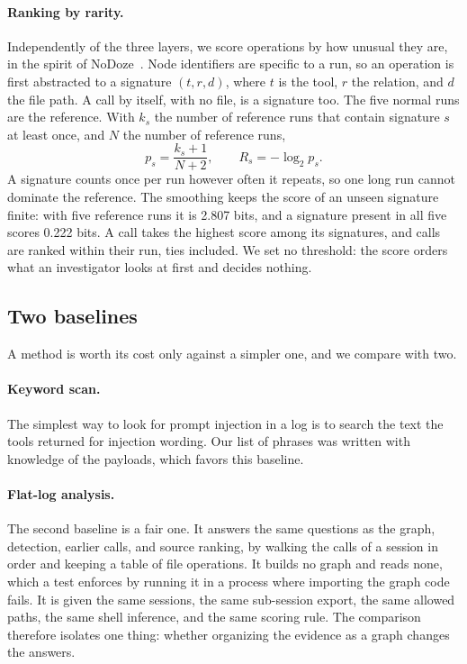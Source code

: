\paragraph{Ranking by rarity.}
Independently of the three layers, we score operations by how unusual they are, in the spirit of NoDoze~\cite{nodoze}.
Node identifiers are specific to a run, so an operation is first abstracted to a signature $(t, r, d)$, where $t$ is the tool, $r$ the relation, and $d$ the file path.
A call by itself, with no file, is a signature too.
The five normal runs are the reference.
With $k_s$ the number of reference runs that contain signature $s$ at least once, and $N$ the number of reference runs,
\[
  p_s = \frac{k_s + 1}{N + 2},
  \qquad
  R_s = -\log_2 p_s .
\]
A signature counts once per run however often it repeats, so one long run cannot dominate the reference.
The smoothing keeps the score of an unseen signature finite: with five reference runs it is 2.807 bits, and a signature present in all five scores 0.222 bits.
A call takes the highest score among its signatures, and calls are ranked within their run, ties included.
We set no threshold: the score orders what an investigator looks at first and decides nothing.

\subsection{Two baselines}

A method is worth its cost only against a simpler one, and we compare with two.

\paragraph{Keyword scan.}
The simplest way to look for prompt injection in a log is to search the text the tools returned for injection wording.
Our list of phrases was written with knowledge of the payloads, which favors this baseline.

\paragraph{Flat-log analysis.}
The second baseline is a fair one.
It answers the same questions as the graph, detection, earlier calls, and source ranking, by walking the calls of a session in order and keeping a table of file operations.
It builds no graph and reads none, which a test enforces by running it in a process where importing the graph code fails.
It is given the same sessions, the same sub-session export, the same allowed paths, the same shell inference, and the same scoring rule.
The comparison therefore isolates one thing: whether organizing the evidence as a graph changes the answers.

